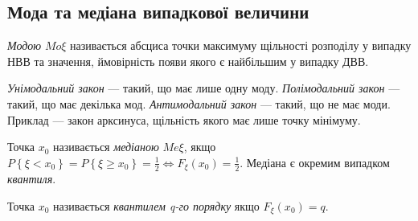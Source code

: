 \subsection{Мода та медіана випадкової величини}
\begin{definition}
    \emph{Модою} ${Mo}\xi$ називається абсциса точки максимуму щільності 
    розподілу у випадку НВВ та значення, ймовірність 
    появи якого є найбільшим у випадку ДВВ.

    \emph{Унімодальний закон} --- такий, що має лише одну моду. 
    \emph{Полімодальний закон} --- такий, що має декілька мод.
    \emph{Антимодальний закон} --- такий, що не має моди. Приклад --- закон арксинуса, щільність якого має лише точку мінімуму.
\end{definition}
\begin{definition}
    Точка $x_0$ називається \emph{медіаною} $Me\xi$, якщо 
    $P\left\{\xi < x_0\right\} = P\left\{\xi \geq x_0\right\} 
    = \frac{1}{2} \Leftrightarrow F_\xi(x_0) = \frac{1}{2}$.
    Медіана є окремим випадком \emph{квантиля}.
\end{definition}
\begin{definition}
    Точка $x_0$ називається \emph{квантилем q-го порядку} якщо $F_\xi(x_0) = q$.
\end{definition}
